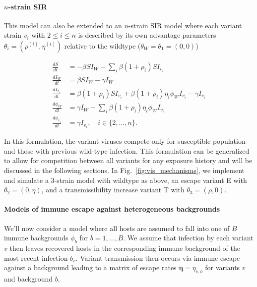 \documentclass[11pt,oneside,letterpaper]{article}
\renewcommand{\vec}[1]{\boldsymbol{#1}}
\newcommand{\wt}{W}
\newcommand{\varEscape}{\eta}
\newcommand{\varTransmission}{\rho}
\begin{document}
\paragraph{$n$-strain SIR}%

This model can also be extended to an $n$-strain SIR model where each variant strain $v_i$ with $2\leq i \leq n$ is described by its own advantage parameters $\theta_{i} = (\varTransmission^{(i)}, \varEscape ^{(i)})$  relative to the wildtype ($\theta_{\wt} = \theta_{1} = (0, 0)$)

\begin{align}
    \frac{d S}{d t} &= - \beta S I_{\wt} - \sum_{i} \beta (1+\varTransmission_i) S I_{v_{i}}\\
    \frac{d I_{\wt}}{dt} &= \beta S I_{\wt} - \gamma I_{\wt}\\
    \frac{d I_{v_{i}}}{dt} &= \beta (1+\varTransmission_i) S I_{v_{i}} + \beta (1+\varTransmission_i) \varEscape_i \phi_{\wt} I_{v_{i}} - \gamma I_{v_{i}}\\
    \frac{d \phi_{\wt}}{dt} &= \gamma I_{\wt} - \sum_{i} \beta (1+\varTransmission_i) \varEscape_i \phi_{\wt} I_{v_{i}}\\
    \frac{d \phi_{v_{i}}}{dt} &= \gamma I_{v_{i}}, \quad i \in \{2, \ldots, n\}.
\end{align}

In this formulation, the variant viruses compete only for susceptible population and those with previous wild-type infection.
This formulation can be generalized to allow for competition between all variants for any exposure history and will be discussed in the following sections.
In Fig.~\ref{fig:vis_mechanisms}, we implement and simulate a 3-strain model with wildtype as above, an escape variant E with $\theta_{2} = (0, \varEscape)$, and a transmissibility increase variant T with $\theta_{3} = (\varTransmission, 0)$.

\paragraph{Models of immune escape against heterogeneous backgrounds}%

We'll now consider a model where all hosts are assumed to fall into one of $B$ immune backgrounds $\phi_{b}$ for $b =1, \ldots, B$.
We assume that infection by each variant $v$ then leaves recovered hosts in the corresponding immune background of the most recent infection $b_{v}$.
Variant transmission then occurs via immune escape against a background leading to a matrix of escape rates $\vec{\varEscape} = \varEscape_{v,b}$ for variants $v$ and background $b$.
\end{document}
